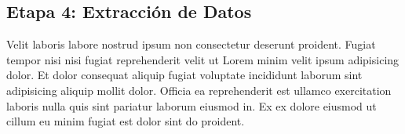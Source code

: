 \subsection{Etapa 4: Extracción de Datos}

Velit laboris labore nostrud ipsum non consectetur deserunt proident. Fugiat tempor nisi nisi fugiat reprehenderit velit ut Lorem minim velit ipsum adipisicing dolor. Et dolor consequat aliquip fugiat voluptate incididunt laborum sint adipisicing aliquip mollit dolor. Officia ea reprehenderit est ullamco exercitation laboris nulla quis sint pariatur laborum eiusmod in. Ex ex dolore eiusmod ut cillum eu minim fugiat est dolor sint do proident.